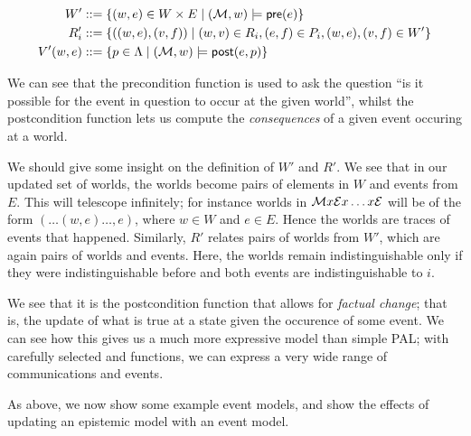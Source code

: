 \documentclass[10pt, a4paper]{report}
\begin{document}
\begin{align*}
  W'   &::= \left\{(w, e) \in W \times E \mid (\mathcal{M}, w) \models \textsf{pre}(e)\right\} \\
  R_i' &::= \left\{((w, e), (v, f)) \mid (w, v) \in R_i, (e, f) \in P_i, (w, e), (v, f) \in W' \right\} \\
  V'(w, e) &::= \left\{ p \in \Lambda \mid (\mathcal{M}, w) \models \textsf{post}(e, p) \right\}
\end{align*}

We can see that the precondition function is used to ask the question ``is it
possible for the event in question to occur at the given world'', whilst the
postcondition function lets us compute the \emph{consequences} of a given event
occuring at a world. 

We should give some insight on the definition of $W'$ and $R'$. We see that in
our updated set of worlds, the worlds become pairs of elements in $W$ and events
from $E$. This will telescope infinitely; for instance worlds in $\mathcal{M} x
\mathcal{E} x \ldots x \mathcal{E}$ will be of the form $(\ldots (w ,e) \ldots, e)$, where
$w \in W$ and $e \in E$. Hence the worlds are traces of events that happened.
Similarly, $R'$ relates pairs of worlds from $W'$, which are again pairs of
worlds and events. Here, the worlds remain indistinguishable only if they were
indistinguishable before and both events are indistinguishable to $i$.

We see that it is the postcondition function that allows for \emph{factual
  change}; that is, the update of what is true at a state given the occurence of
some event. We can see how this gives us a much more expressive model than
simple PAL; with carefully selected \tpre and \tpost functions, we can express a
very wide range of communications and events. 

\bigskip \bigskip \bigskip

As above, we now show some example event models, and show the effects of
updating an epistemic model with an event model.
\end{document}
